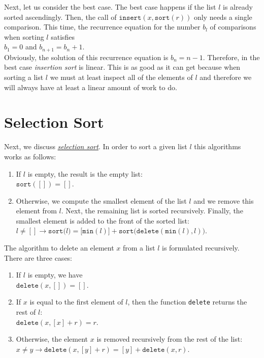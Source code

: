 Next, let us consider the best case.  The best case happens if the list $l$ is already sorted
ascendingly.  Then, the call of 
$\mathtt{insert}(x,\mathtt{sort}(r))$ only needs a single comparison.  This time, the recurrence
equation for the number $b_l$ of comparisons when sorting $l$ satisfies
 \\[0.2cm]
\hspace*{1.3cm}
$b_1 = 0$ \quad and \quad $b_{n+1} = b_n + 1$. 
\\[0.2cm]
Obviously, the solution of this recurrence equation is $b_n = n-1$.  Therefore, in the best case
\emph{insertion sort} is linear.  This is as good as it can get because when sorting a list $l$ we
must at least inspect all of the elements of $l$ and therefore we will always have at least a linear
amount of work to do.


\section{Selection Sort}
Next, we discuss 
\href{http://en.wikipedia.org/wiki/Selection_sort}{\emph{selection sort}}.  In order to sort a given
list $l$ this algorithms works as
follows:
\begin{enumerate}
\item If $l$ is empty, the result is the empty list: \\[0.2cm]
      \hspace*{1.3cm} $\mathtt{sort}([]) = []$.
\item Otherwise, we compute the smallest element of the list $l$ and we remove this element from
      $l$.  Next, the remaining list is sorted recursively.  Finally, the smallest element is added
      to the front of the sorted list:
      \\[0.2cm]
      \hspace*{1.3cm} 
      $l \not= [] \rightarrow \mathtt{sort}\bigl(l\bigr) = \bigl[\texttt{min}(l)\bigr]
      + \mathtt{sort}\bigl(\mathtt{delete}(\texttt{min}(l), l)\bigr)$.
\end{enumerate}
The algorithm to delete an element $x$ from a list $l$ is formulated recursively.  There are three cases:
\begin{enumerate}
\item If $l$ is empty, we have \\[0.2cm]
      \hspace*{1.3cm} $\mathtt{delete}(x, []) = []$.
\item If $x$ is equal to the first element of $l$, then the function \texttt{delete} returns the
      rest of $l$: \\[0.2cm]
      \hspace*{1.3cm} 
      $\mathtt{delete}(x, [x] + r) = r$.
\item Otherwise, the element $x$ is removed recursively from the rest of the list: \\[0.2cm]
      \hspace*{1.3cm}   
      $x \not = y \rightarrow \mathtt{delete}(x, [y] + r) = [y] + \mathtt{delete}(x,r)$.
\end{enumerate}
